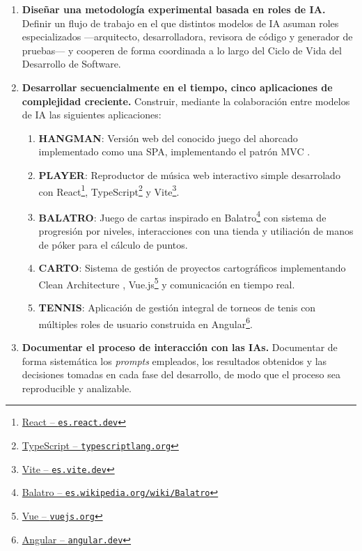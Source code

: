 \begin{enumerate}
  \item \textbf{Diseñar una metodología experimental basada en roles de IA.} Definir un flujo de trabajo en el que distintos modelos de \ac{IA} asuman roles especializados ---arquitecto, desarrolladora, revisora de código y generador de pruebas--- y cooperen de forma coordinada a lo largo del
  Ciclo de Vida del Desarrollo de Software.

  \item \textbf{Desarrollar secuencialmente en el tiempo, cinco aplicaciones de complejidad creciente.} Construir, mediante la colaboración entre modelos de \ac{IA} las siguientes aplicaciones:
  \begin{enumerate}
    \item \textbf{\ac{HANGMAN}}: Versión web del conocido juego del ahorcado implementado como una \ac{SPA}, implementando el patrón \ac{MVC}  \cite{Reenskaug:1979:MVC}.
    \item \textbf{\ac{PLAYER}}: Reproductor de música web interactivo simple desarrolado con React\footnote{\href{https://es.react.dev}{React -- \texttt{es.react.dev}}}, TypeScript\footnote{\href{https://www.typescriptlang.org}{TypeScript -- \texttt{typescriptlang.org}}} y Vite\footnote{\href{https://es.vite.dev}{Vite -- \texttt{es.vite.dev}}}. 
    \item \textbf{\ac{BALATRO}}: Juego de cartas inspirado en Balatro\footnote{\href{https://es.wikipedia.org/wiki/Balatro}{Balatro -- \texttt{es.wikipedia.org/wiki/Balatro}}} con sistema de progresión por niveles, interacciones con una tienda y utiliación de manos de póker para el cálculo de puntos.
    \item \textbf{\ac{CARTO}}: Sistema de gestión de proyectos cartográficos implementando Clean Architecture \cite{Martin:2018:CleanArchitecture}, Vue.js\footnote{\href{https://vuejs.org}{Vue -- \texttt{vuejs.org}}} y comunicación en tiempo real.
    \item \textbf{\ac{TENNIS}}: Aplicación de gestión integral de torneos de tenis con múltiples roles de usuario construida en Angular\footnote{\href{https://angular.dev}{Angular -- \texttt{angular.dev}}}.
  \end{enumerate}

  \item \textbf{Documentar el proceso de interacción con las IAs.} Documentar de forma sistemática los \textit{prompts} empleados, los resultados obtenidos y las decisiones tomadas en cada fase del desarrollo, de modo que el proceso sea reproducible y analizable.


\end{enumerate}
